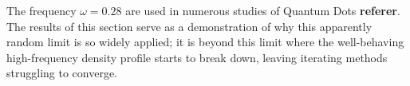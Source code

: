 The frequency $\omega=0.28$ are used in numerous studies of Quantum Dots \textbf{referer}. The results of this section serve as a demonstration of why this apparently random limit is so widely applied; it is beyond this limit where the well-behaving high-frequency density profile starts to break down, leaving iterating methods struggling to converge.   

\begin{figure}
 \begin{center}
   \\

\end{center}
\end{figure}
